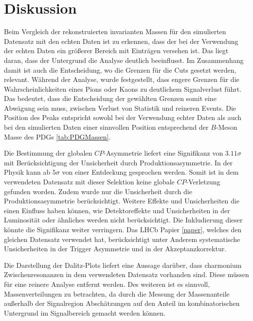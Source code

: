 \section{Diskussion}
\label{sec:discussion}

Beim Vergleich der rekonstruierten invarianten Massen für den simulierten Datensatz
mit den echten Daten ist zu erkennen, dass der bei der Verwendung der echten Daten
ein größerer Bereich mit Einträgen versehen ist. Das liegt daran, dass der Untergrund
die Analyse deutlich beeinflusst. Im Zusammenhang damit ist auch die Entscheidung, wo
die Grenzen für die Cuts gesetzt werden, relevant. Während der Analyse, wurde
festgestellt, dass engere Grenzen für die Wahrscheinlichkeiten eines Pions oder
Kaons zu deutlichem Signalverlust führt. Das bedeutet, dass die Entscheidung der
gewählten Grenzen somit eine Abwägung sein muss, zwischen Verlust von Statistik
und reineren Events. Die Position des Peaks entspricht sowohl bei der Verwendung
echter Daten als auch bei den simulierten Daten einer sinnvollen Position entsprechend
der $B$-Meson Masse des PDGs \ref{tab:PDGMassen}. \par

Die Bestimmung der globalen $CP$-Asymmetrie liefert eine Signifikanz von
$3.11\sigma$ mit Berücksichtigung der Unsicherheit durch
Produktionsasymmetrie. In der Physik kann ab $5\sigma$ von einer Entdeckung
gesprochen werden. Somit ist in dem verwendeten Datensatz mit dieser
Selektion keine globale $CP$-Verletzung gefunden worden. Zudem wurde nur die
Unsicherheit durch die Produktionsasymmetrie berücksichtigt. Weitere Effekte
und Unsicherheiten die einen Einfluss haben können, wie Detektoreffekte und
Unsicherheiten in der Luminosität oder ähnliches werden nicht berücksichtigt.
Die Inkludierung dieser könnte die Signifikanz weiter verringern. Das LHCb
Papier \ref{paper}, welches den gleichen Datensatz verwendet hat, berücksichtigt
unter Anderem systematische Unsicherheiten in der Trigger Asymmetrie und
in der Akzeptanzkorrektur. \par

Die Darstellung der Dalitz-Plots liefert eine Aussage darüber, dass charmonium
Zwischenresonanzen in dem verwendeten Datensatz vorhanden sind. Diese müssen
für eine reinere Analyse entfernt werden. Des weiteren ist es sinnvoll,
Massenverteilungen zu betrachten, da durch die Messung der Massenanteile
außerhalb der Signalregion Abschätzungen auf den Anteil im kombinatorischen
Untergrund im Signalbereich gemacht werden können.\par

